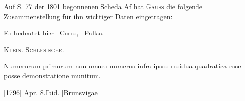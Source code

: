\indent Auf S. 77 der 1801 begonnenen Scheda Af hat \textsc{Gauss} die folgende Zusammenstellung für ihn wichtiger Daten eingetragen:
\begin{center}
\setlength{\fboxsep}{9pt}
\end{center}
\noindent\centerline{Es bedeutet hier \DiaryCeres\ Ceres, \DiaryPallas\ Pallas.}
\par\noindent\hfill\textsc{Klein. Schlesinger.}
\par\endgroup\endgroup

\clearpage{}
\indent Numerorum primorum non omnes numeros infra ipsos residua quadratica esse posse demonstratione munitum.
\par\noindent\hfill[1796] Apr. 8.\quad Ibid. [Brunsvigae]

